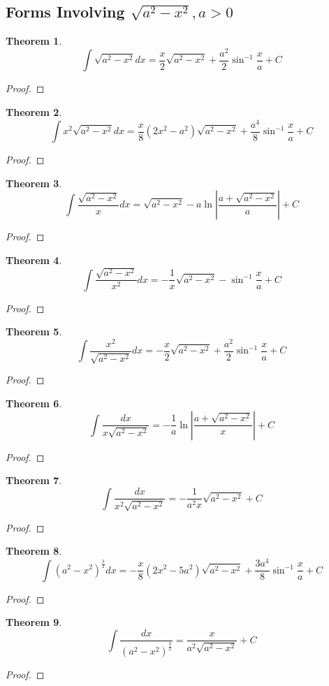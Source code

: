 \documentclass[10pt]{report}
\newtheorem{thm3}{Theorem}[subsection]
\begin{document}
\subsection{Forms Involving $\sqrt{a^2 - x^2}, a>0$}
\begin{thm3}
$$\int \sqrt{a^2-x^2}dx = \frac{x}{2}\sqrt{a^2-x^2} + \frac{a^2}{2}\sin^{-1}\frac{x}{a} + C$$
\end{thm3}
\begin{proof}

\end{proof}
\begin{thm3}
$$\int x^2\sqrt{a^2-x^2}dx = \frac{x}{8}(2x^2-a^2)\sqrt{a^2-x^2} + \frac{a^4}{8}\sin^{-1}\frac{x}{a} + C$$
\end{thm3}
\begin{proof}

\end{proof}
\begin{thm3}
$$\int \frac{\sqrt{a^2-x^2}}{x}dx=\sqrt{a^2-x^2} - a\ln\left| \frac{a +\sqrt{a^2-x^2}}{a} \right| + C$$
\end{thm3}
\begin{proof}

\end{proof}
\begin{thm3}
$$\int \frac{\sqrt{a^2-x^2}}{x^2}dx=-\frac{1}{x}\sqrt{a^2-x^2} - \sin^{-1}\frac{x}{a}+C$$
\end{thm3}
\begin{proof}

\end{proof}
\begin{thm3}
$$\int \frac{x^2}{\sqrt{a^2-x^2}}dx = -\frac{x}{2}\sqrt{a^2-x^2} + \frac{a^2}{2}\sin^{-1}\frac{x}{a}+C$$
\end{thm3}
\begin{proof}

\end{proof}
\begin{thm3}
$$\int \frac{dx}{x\sqrt{a^2-x^2}} = -\frac{1}{a}\ln \left|\frac{a + \sqrt{a^2-x^2}}{x}\right|+C$$
\end{thm3}
\begin{proof}

\end{proof}
\begin{thm3}
$$\int \frac{dx}{x^2\sqrt{a^2-x^2}} = -\frac{1}{a^2x}\sqrt{a^2-x^2} + C$$
\end{thm3}
\begin{proof}

\end{proof}
\begin{thm3}
$$\int (a^2 - x^2)^{\frac{3}{2}} dx = -\frac{x}{8}(2x^2 - 5a^2)\sqrt{a^2-x^2} + \frac{3a^4}{8}\sin^{-1}\frac{x}{a} + C$$
\end{thm3}
\begin{proof}

\end{proof}
\begin{thm3}
$$\int \frac{dx}{(a^2-x^2)^{\frac{3}{2}}} = \frac{x}{a^2\sqrt{a^2-x^2}} + C$$
\end{thm3}
\begin{proof}

\end{proof}
\end{document}

